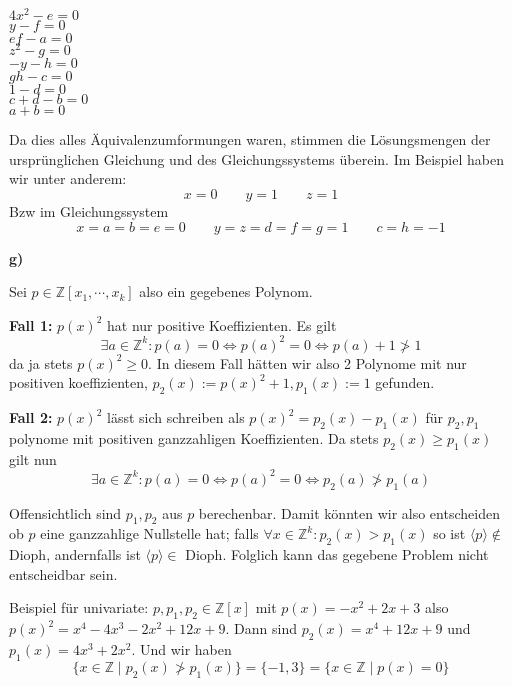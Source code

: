 \documentclass[a4paper,graphics,11pt]{article}
\newcommand{\godel}[1]{\langle #1 \rangle}
\begin{document}
\begin{minipage}{.3\textwidth}
$4x^2 - e = 0$\\
$y-f = 0$\\
$ef -a = 0$\\
$z^2 - g = 0$\\
$-y -h = 0$\\
$gh - c = 0$\\
$1 - d = 0$\\
$c+d - b = 0$\\
$a+b = 0$
\end{minipage}
\begin{minipage}{.7\textwidth}
    Da dies alles Äquivalenzumformungen waren, stimmen die Lösungsmengen
    der ursprünglichen Gleichung und des Gleichungssystems überein.
    Im Beispiel haben wir unter anderem:
    $$
        x = 0\qquad
        y= 1\qquad
        z = 1
    $$
    Bzw im Gleichungssystem
    $$
        x = a = b = e = 0 \qquad
        y = z = d = f = g = 1\qquad
        c = h = -1
    $$
\end{minipage}

\textbf{g)}

Sei $p \in \mathbb{Z}[x_1,\cdots,x_k]$ also ein gegebenes Polynom.

\textbf{Fall 1:} $p(x)^2$ hat nur positive Koeffizienten. Es gilt
$$
    \exists a \in \mathbb{Z}^k : p(a) = 0 \iff p(a)^2 = 0 \iff p(a)+1 \not> 1
$$
da ja stets $p(x)^2 \geq 0$. In diesem Fall hätten wir also 2 Polynome mit nur positiven koeffizienten,
$p_2(x) := p(x)^2 + 1, p_1(x) := 1$ gefunden.

\textbf{Fall 2:} $p(x)^2$ lässt sich schreiben als $p(x)^2 = p_2(x) - p_1(x)$ für
$p_2,p_1$ polynome mit positiven ganzzahligen Koeffizienten. Da stets $p_2(x) \geq p_1(x)$ gilt nun
$$
    \exists a \in \mathbb{Z}^k: p(a) = 0
    \iff
    p(a)^2 = 0
    \iff
    p_2(a) \not> p_1(a)
$$

Offensichtlich sind $p_1,p_2$ aus $p$ berechenbar. Damit könnten wir also entscheiden ob $p$ eine ganzzahlige
Nullstelle hat; falls $\forall x \in \mathbb{Z}^k : p_2(x) > p_1(x)$ so ist $\godel{p} \notin$ Dioph,
andernfalls ist $\godel{p} \in$ Dioph. Folglich kann das gegebene Problem nicht entscheidbar sein.

Beispiel für univariate: $p,p_1,p_2 \in \mathbb{Z}[x]$ mit $p(x) = -x^2+2x+3$ also $p(x)^2 = x^4-4x^3-2x^2+12x+9$.
Dann sind $p_2(x) = x^4+12x+9$ und $p_1(x) = 4x^3+2x^2$. Und wir haben
$$
    \{x \in \mathbb{Z} \mid p_2(x) \not> p_1(x)\} = \{-1,3\} = \{x \in \mathbb{Z} \mid p(x) = 0\}
$$
\end{document}

